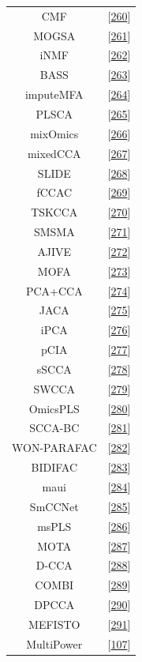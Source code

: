 \documentclass[
  12pt,
  a4paper,
  twoside,
  openright]{book}
\begin{document}
\begin{longtable}[]{@{}cc@{}}
CMF & {[}\protect\hyperlink{ref-klami2014}{260}{]} \\
MOGSA & {[}\protect\hyperlink{ref-meng2018}{261}{]} \\
iNMF & {[}\protect\hyperlink{ref-yang2016b}{262}{]} \\
BASS & {[}\protect\hyperlink{ref-zhao2015}{263}{]} \\
imputeMFA & {[}\protect\hyperlink{ref-voillet2016}{264}{]} \\
PLSCA & {[}\protect\hyperlink{ref-beaton2016}{265}{]} \\
mixOmics & {[}\protect\hyperlink{ref-singh2019}{266}{]} \\
mixedCCA & {[}\protect\hyperlink{ref-yoon2019}{267}{]} \\
SLIDE & {[}\protect\hyperlink{ref-gaynanova2017}{268}{]} \\
fCCAC & {[}\protect\hyperlink{ref-madrigal2017}{269}{]} \\
TSKCCA & {[}\protect\hyperlink{ref-yoshida2017}{270}{]} \\
SMSMA & {[}\protect\hyperlink{ref-kawaguchi2017}{271}{]} \\
AJIVE & {[}\protect\hyperlink{ref-feng2018}{272}{]} \\
MOFA & {[}\protect\hyperlink{ref-argelaguet2020}{273}{]} \\
PCA+CCA & {[}\protect\hyperlink{ref-brown2018}{274}{]} \\
JACA & {[}\protect\hyperlink{ref-zhang2020}{275}{]} \\
iPCA & {[}\protect\hyperlink{ref-tang2021}{276}{]} \\
pCIA & {[}\protect\hyperlink{ref-min2019}{277}{]} \\
sSCCA & {[}\protect\hyperlink{ref-safo2018}{278}{]} \\
SWCCA & {[}\protect\hyperlink{ref-min2017}{279}{]} \\
OmicsPLS & {[}\protect\hyperlink{ref-bouhaddani2018}{280}{]} \\
SCCA-BC & {[}\protect\hyperlink{ref-pimentel2018}{281}{]} \\
WON-PARAFAC & {[}\protect\hyperlink{ref-kim2019}{282}{]} \\
BIDIFAC & {[}\protect\hyperlink{ref-lock2020}{283}{]} \\
maui & {[}\protect\hyperlink{ref-ronen2019}{284}{]} \\
SmCCNet & {[}\protect\hyperlink{ref-shi2019}{285}{]} \\
msPLS & {[}\protect\hyperlink{ref-csala2020}{286}{]} \\
MOTA & {[}\protect\hyperlink{ref-fan2020}{287}{]} \\
D-CCA & {[}\protect\hyperlink{ref-shu2020}{288}{]} \\
COMBI & {[}\protect\hyperlink{ref-hawinkel2020}{289}{]} \\
DPCCA & {[}\protect\hyperlink{ref-gundersen2020}{290}{]} \\
MEFISTO & {[}\protect\hyperlink{ref-velten2020}{291}{]} \\
MultiPower & {[}\protect\hyperlink{ref-tarazona2020}{107}{]} \\
\bottomrule
\end{longtable}
\end{document}

